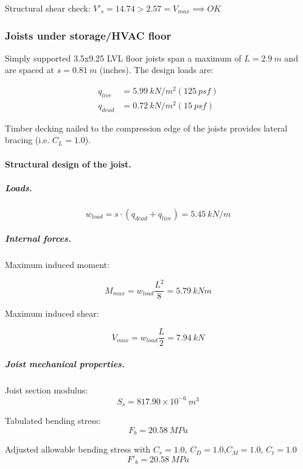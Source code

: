 \noindent Structural shear check: $V'_s = 14.74 > 2.57 = V_{max} \implies OK$

\subsubsection{Joists under storage/HVAC floor}
Simply supported 3.5x9.25 LVL floor joists span a maximum of $L= 2.9\ m$ and are spaced at $s= 0.81\ m$ (\unit[32]{inches}). The design loads are:

\begin{align}
  q_{live}&= 5.99\ kN/m^2 (125\ psf) \\
  q_{dead}&= 0.72\ kN/m^2 (15\ psf)
\end{align}

Timber decking nailed to the compression edge of the joists provides lateral bracing (i.e. $C_L= 1.0$).

\paragraph{Structural design of the joist.}

\subparagraph{Loads.}

\begin{equation}
  w_{load}= s \cdot (q_{dead}+q_{live})= 5.45\ kN/m
\end{equation}

\subparagraph{Internal forces.}

\noindent Maximum induced moment:

\begin{equation}
  M_{max}= w_{load} \frac{L^2}{8}= 5.79\ kN m
\end{equation}

\noindent Maximum induced shear:

\begin{equation}
  V_{max}= w_{load} \frac{L}{2}= 7.94\ kN
\end{equation}

\subparagraph{Joist mechanical properties.}

\noindent Joist section modulus:
\begin{equation}
  S_s= 817.90 \times 10^{-6}\ m^3
\end{equation}

\noindent Tabulated bending stress:
\begin{equation}
  F_b= 20.58\ MPa
\end{equation}


\noindent Adjusted allowable bending stress with $C_r= 1.0$, $C_D= 1.0$,$C_M= 1.0$, $C_t= 1.0$
\begin{equation}
  F'_b= 20.58\ MPa
\end{equation}

